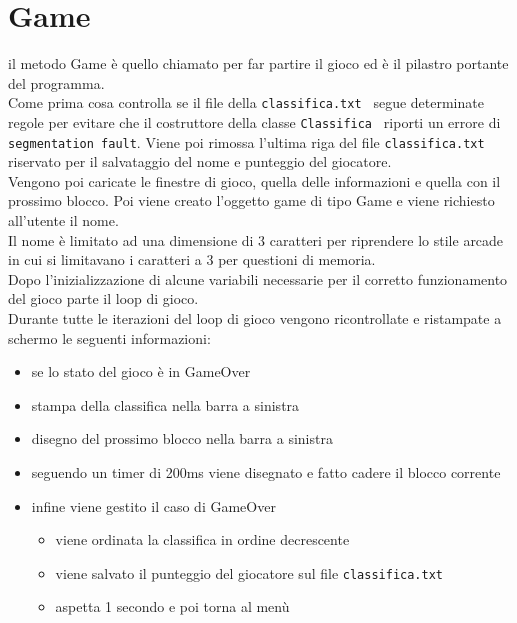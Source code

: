 \documentclass[a4paper]{article}
\begin{document}
\section{Game}
il metodo Game è quello chiamato per far partire il gioco ed è il pilastro portante del programma. \\
Come prima cosa controlla se il file della \color{green}\verb|classifica.txt |\color{black} segue determinate regole per evitare che il costruttore della classe \color{cyan}\verb!Classifica !\color{black} riporti un errore di \verb!segmentation fault!.
Viene poi rimossa l'ultima riga del file \color{green}\verb|classifica.txt |\color{black} riservato per il salvataggio del nome e punteggio del giocatore.\\
Vengono poi caricate le finestre di gioco, quella delle informazioni e quella con il prossimo blocco.
Poi viene creato l'oggetto game di tipo Game e viene richiesto all'utente il nome. \\
Il nome è limitato ad una dimensione di 3 caratteri per riprendere lo stile arcade in cui si limitavano i caratteri a 3 per questioni di memoria. \\
Dopo l'inizializzazione di alcune variabili necessarie per il corretto funzionamento del gioco parte il loop di gioco.\\ 
Durante tutte le iterazioni del loop di gioco vengono ricontrollate e ristampate a schermo le seguenti informazioni:
\begin{itemize}
    \item se lo stato del gioco è in GameOver
    \item stampa della classifica nella barra a sinistra
    \item disegno del prossimo blocco nella barra a sinistra
    \item seguendo un timer di 200ms viene disegnato e fatto cadere il blocco corrente
    \item infine viene gestito il caso di GameOver
    \begin{itemize}
        \item viene ordinata la classifica in ordine decrescente 
        \item viene salvato il punteggio del giocatore sul file \color{green}\verb|classifica.txt |\color{black}
        \item aspetta 1 secondo e poi torna al menù
    \end{itemize}
\end{itemize}
\end{document}
